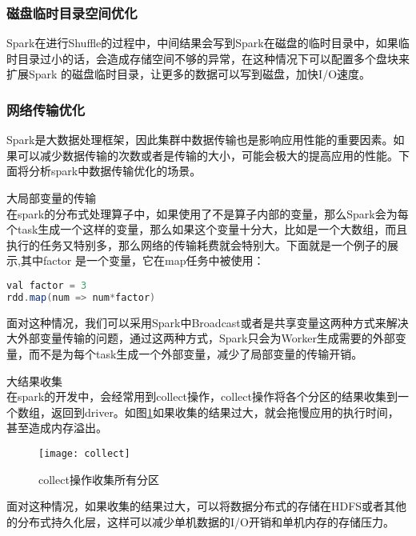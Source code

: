 \subsubsection{磁盘临时目录空间优化}
Spark在进行Shuffle的过程中，中间结果会写到Spark在磁盘的临时目录中，如果临时目录过小的话，会造成存储空间不够的异常，在这种情况下可以配置多个盘块来扩展Spark 的磁盘临时目录，让更多的数据可以写到磁盘，加快I/O速度。
\subsubsection{网络传输优化}
Spark是大数据处理框架，因此集群中数据传输也是影响应用性能的重要因素。如果可以减少数据传输的次数或者是传输的大小，可能会极大的提高应用的性能。下面将分析spark中数据传输优化的场景。
\begin{compactenum}
\item 大局部变量的传输\\在spark的分布式处理算子中，如果使用了不是算子内部的变量，那么Spark会为每个task生成一个这样的变量，那么如果这个变量十分大，比如是一个大数组，而且执行的任务又特别多，那么网络的传输耗费就会特别大。下面就是一个例子的展示,其中factor 是一个变量，它在map任务中被使用：
\begin{lstlisting}[language=Java,numbers=none,frame=none]
val factor = 3
rdd.map(num => num*factor)
\end{lstlisting}

面对这种情况，我们可以采用Spark中Broadcast或者是共享变量这两种方式来解决大外部变量传输的问题，通过这两种方式，Spark只会为Worker生成需要的外部变量，而不是为每个task生成一个外部变量，减少了局部变量的传输开销。
\item 大结果收集\\在spark的开发中，会经常用到collect操作，collect操作将各个分区的结果收集到一个数组，返回到driver。如图\ref{fig:collect}如果收集的结果过大，就会拖慢应用的执行时间，甚至造成内存溢出。
\begin{figure}[htp]
\centering
\texttt{[image: collect]}
\caption{collect操作收集所有分区}
\label{fig:collect}
\end{figure}
面对这种情况，如果收集的结果过大，可以将数据分布式的存储在HDFS或者其他的分布式持久化层，这样可以减少单机数据的I/O开销和单机内存的存储压力。
\end{compactenum}
